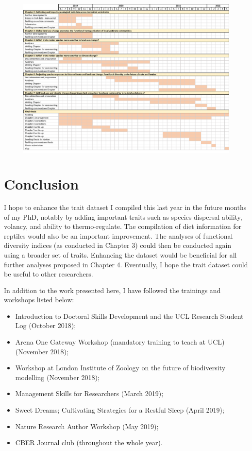 \begin{landscape}
\begin{figure}[h!]
\centering
\includegraphics[scale=0.9]{figures/chapter4/Ganttchart}
\end{figure}\end{landscape}

\newpage
{}
\chapter*{Conclusion}
I hope to enhance the trait dataset I compiled this last year in the future months of my PhD, notably by adding important traits such as species dispersal ability, volancy, and ability to thermo-regulate. The compilation of diet information for reptiles would also be an important improvement. The analyses of functional diversity indices (as conducted in Chapter 3) could then be conducted again using a broader set of traits. Enhancing the dataset would be beneficial for all further analyses proposed in Chapter 4. Eventually, I hope the trait dataset could be useful to other researchers.
\vskip 0.5cm

In addition to the work presented here, I have followed the trainings and workshops listed below:
\begin{itemize}
\item Introduction to Doctoral Skills Development and the UCL Research Student Log (October 2018); 
\item Arena One Gateway Workshop (mandatory training to teach at UCL) (November 2018); 
\item  Workshop at London Institute of Zoology on the future of biodiversity modelling (November 2018);
\item Management Skills for Researchers (March 2019); 
\item Sweet Dreams; Cultivating Strategies for a Restful Sleep (April 2019); 
\item Nature Research Author Workshop (May 2019);
\item CBER Journal club (throughout the whole year).
\end{itemize}




